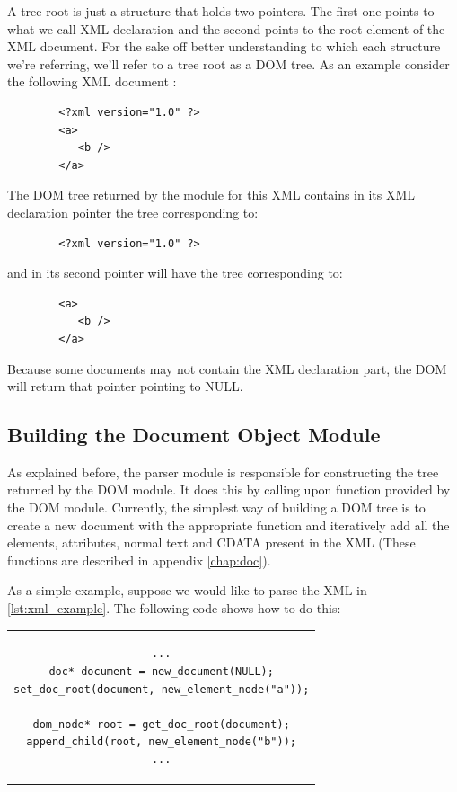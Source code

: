 \documentclass[a4paper]{report}
\begin{document}
	\pagebreak
	A tree root is just a structure that holds two pointers. The first one points to what we call XML declaration and the second points to the root element of the XML document. For the sake off better understanding to which each 	structure we're referring, we'll refer to a tree root as a DOM tree. As an example consider the following XML document	:
	
	\lstset{language=XML,caption=Sample XML file, captionpos=b}
	\begin{lstlisting}
		<?xml version="1.0" ?>
		<a>
		   <b />
		</a>
	\end{lstlisting}
	
	The DOM tree returned by the module for this XML contains in its XML declaration pointer the tree corresponding to:
	\lstset{language=XML,caption=Sample XML declaration, captionpos=b}
	\begin{lstlisting}
		<?xml version="1.0" ?>
	\end{lstlisting}
	
	and in its second pointer will have the tree corresponding to:
	\label{lst:xml_example}
	\lstset{language=XML,caption=Sample XML file without XML declaration, captionpos=b}
	\begin{lstlisting}
		<a>
		   <b />
		</a>
	\end{lstlisting}

	Because some documents may not contain the XML declaration part, the DOM will return that pointer pointing to NULL.		

	\subsection{Building the Document Object Module}
		As explained before, the parser module is responsible for constructing the tree returned by the DOM module. It does this by calling upon function provided by the DOM module. Currently, the simplest way of building a 
		DOM tree is to create a new document with the appropriate function and iteratively add all the elements, attributes, normal text and CDATA present in the XML (These functions are described in appendix 
		\ref{chap:doc}).
		
		As a simple example, suppose we would like to parse the XML in \ref{lst:xml_example}. The following code shows how to do this:

	\begin{center}
	\lstset{language=C,numbers=left, captionpos=b, caption=Sample code to build a DOM tree.}
		\begin{tabular}{c}
	\begin{lstlisting}		
...
doc* document = new_document(NULL);
set_doc_root(document, new_element_node("a"));
	
dom_node* root = get_doc_root(document);
append_child(root, new_element_node("b"));
...
	\end{lstlisting}		
	\end{tabular}
	\end{center}
	
\end{document}
